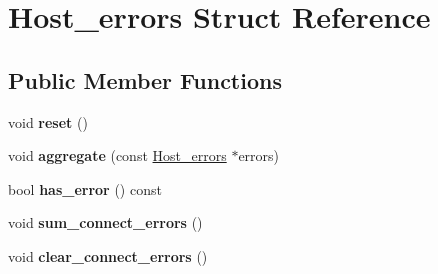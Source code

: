 \hypertarget{structHost__errors}{}\section{Host\+\_\+errors Struct Reference}
\label{structHost__errors}
\subsection*{Public Member Functions}
\begin{DoxyCompactItemize}
\item 
\mbox{\label{structHost__errors_a5e1734c16366c4e0096ef6a88a0bd34d}} 
void {\bfseries reset} ()
\item 
\mbox{\label{structHost__errors_a7ca25d5c048a391450aa2fd02383edbb}} 
void {\bfseries aggregate} (const \mbox{\hyperlink{structHost__errors}{Host\+\_\+errors}} $\ast$errors)
\item 
\mbox{\label{structHost__errors_a59099cae9f4cab4b518b27074749240f}} 
bool {\bfseries has\+\_\+error} () const
\item 
\mbox{\label{structHost__errors_a6406c57e9608b842f8e4f01e9b3d0e85}} 
void {\bfseries sum\+\_\+connect\+\_\+errors} ()
\item 
\mbox{\label{structHost__errors_a314fdf035fd9ed073a94aee9c9ff28f7}} 
void {\bfseries clear\+\_\+connect\+\_\+errors} ()
\end{DoxyCompactItemize}
